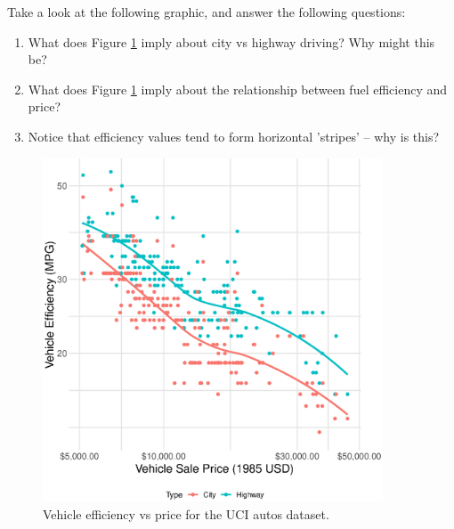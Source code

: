 \documentclass{article}
\begin{document}
Take a look at the following graphic, and answer the following questions:

\begin{enumerate}
\item What does Figure \ref{fig:mpg-vs-usd} imply about city vs highway driving?
  Why might this be?
\item What does Figure \ref{fig:mpg-vs-usd} imply about the relationship between
  fuel efficiency and price?
\item Notice that efficiency values tend to form horizontal 'stripes' -- why is
  this?
\end{enumerate}

\begin{figure}[!ht]
  \includegraphics[width=0.90\textwidth]{../images/mpg_vs_usd}
  \caption{Vehicle efficiency vs price for the UCI autos dataset.}
  \label{fig:mpg-vs-usd}
\end{figure}
\end{document}
